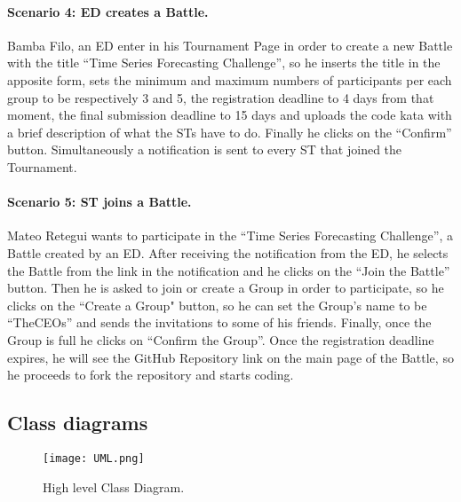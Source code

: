 \paragraph{Scenario 4: ED creates a Battle.}
Bamba Filo, an ED enter in his Tournament Page in order to create a new Battle with the title “Time Series Forecasting Challenge”, so he inserts the title in the apposite form, sets the minimum and maximum numbers of participants per each group to be respectively 3 and 5, the registration deadline to 4 days from that moment, the final submission deadline to 15 days and uploads the code kata with a brief description of what the STs have to do. Finally he clicks on the “Confirm” button. Simultaneously a notification is sent to every ST that joined the Tournament.

\paragraph{Scenario 5: ST joins a Battle.}
Mateo Retegui wants to participate in the “Time Series Forecasting Challenge”, a Battle created by an ED. After receiving the notification from the ED, he selects the Battle from the link in the notification and he clicks on the “Join the Battle” button. Then he is asked to join or create a Group in order to participate, so he clicks on the “Create a Group" button, so he can set the Group’s name to be “TheCEOs” and sends the invitations to some of his friends. Finally, once the Group is full he clicks on “Confirm the Group”. Once the registration deadline expires, he will see the GitHub Repository link on the main page of the Battle, so he proceeds to fork the repository and starts coding.

\newpage

\subsection{Class diagrams}
\label{subsec:class_diagrams}%


\begin{figure}[H]
    \begin{center}
        \texttt{[image: UML.png]}
        \caption{High level Class Diagram.}
        \label{fig:UML}%
    \end{center}
\end{figure}

